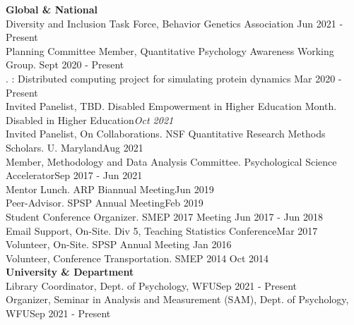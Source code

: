 {\large \textbf{Global \& National}}\smallskip\\
Diversity and Inclusion Task Force, Behavior Genetics Association \hfill{Jun 2021 - Present}\smallskip\\
Planning Committee Member, Quantitative Psychology Awareness Working Group. \hfill{Sept 2020 - Present}\smallskip\\%
. : Distributed computing project for simulating protein dynamics \hfill{Mar 2020 - Present}\smallskip\\
%
Invited Panelist, TBD. {\small Disabled Empowerment in Higher Education Month. Disabled in Higher Education}\hfill{\textit{Oct 2021}}\smallskip\\
Invited Panelist, {\small On Collaborations. NSF Quantitative Research Methods Scholars. U. Maryland}\hfill{Aug 2021}\smallskip\\
Member, Methodology and Data Analysis Committee. Psychological Science Accelerator\hfill{Sep 2017 - Jun 2021}\smallskip\\
%
Mentor Lunch. ARP Biannual Meeting\hfill{Jun 2019}\smallskip\\
Peer-Advisor. SPSP Annual Meeting\hfill{Feb 2019}\smallskip\\
Student Conference Organizer. SMEP 2017 Meeting \hfill{Jun 2017 - Jun 2018}\smallskip\\
Email Support, On-Site. Div 5, Teaching Statistics Conference\hfill{Mar 2017}\smallskip\\
Volunteer, On-Site. SPSP Annual Meeting \hfill{Jan 2016}\smallskip\\
Volunteer, Conference Transportation. SMEP 2014  \hfill{Oct 2014}\medskip\\
%
%
{\large \textbf{University \& Department}}\smallskip\\
Library Coordinator, Dept. of Psychology, WFU\hfill {Sep 2021 - Present}\smallskip\\
Organizer, Seminar in Analysis and Measurement (SAM), Dept. of Psychology, WFU\hfill {Sep 2021 - Present}\smallskip\\
